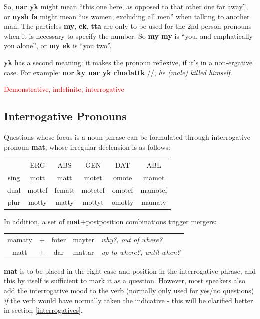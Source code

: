 \documentclass[10pt,oneside]{memoir}
\newcommand{\cmmnt}[1]{\textcolor{red}{#1}}
\newcommand{\ipa}[1]{/\textipa{#1}/}
\begin{document}
So, \textbf{nar yk} might mean ``this one here, as opposed to that other one far away'', or \textbf{nysh fa} might mean ``us women, excluding all men'' when talking to another man. The particles \textbf{my}, \textbf{ek}, \textbf{tta} are only to be used for the 2nd person pronouns when it is necessary to specify the number. So \textbf{my my} is ``you, and emphatically you alone'', or \textbf{my ek} is ``you two''.

\textbf{yk} has a second meaning: it makes the pronoun reflexive, if it's in a non-ergative case. For example: \textbf{nor ky nar yk rbodattk} \ipa{nOr k1 nar 1k rbo"dat:k}, \emph{he (male) killed himself}.

\cmmnt{Demonstrative, indefinite, interrogative}

\subsection{Interrogative Pronouns}

Questions whose focus is a noun phrase can be formulated through interrogative pronoun \textbf{mat}, whose irregular declension is as follows:

\begin{center}
\begin{tabular}[]{*{6}{c}}
 &    ERG & ABS & GEN & DAT & ABL\\
sing &    mott & matt & motet & omote & mamot\\
dual & mottef & fematt & motetef & omotef & mamotef\\
plur & motty & matty & mottyt & omotty & mamaty\\
\end{tabular}
\end{center}

In addition, a set of \textbf{mat}+postposition combinations trigger mergers:

\begin{tabular}[]{c c c | c l}
    mamaty & + & foter & mayter & \emph{why?, out of where?}\\
    matt & + & dar & mattar & \emph{up to where?, until when?}\\
\end{tabular}

\textbf{mat} is to be placed in the right case and position in the interrogative phrase, and this by itself is sufficient to mark it as a question. However, most speakers also add the interrogative mood to the verb (normally only used for yes/no questions) \emph{if} the verb would have normally taken the indicative - this will be clarified better in section \ref{interrogatives}.
\end{document}
